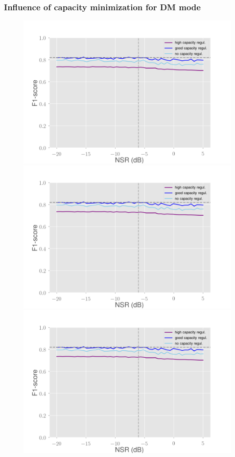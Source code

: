 \documentclass[10pt]{beamer}
\begin{document}
\begin{frame}
\frametitle{Influence of capacity minimization for DM mode}
\begin{multicols}{2}
\begin{figure}
\centering
\begin{overprint}
    \includegraphics[scale=0.2]{figs/capacity-dm-noisy}
    \includegraphics[scale=0.2]{figs/capacity-dm-noisy}
    \includegraphics[scale=0.2]{figs/capacity-dm-noisy}

\end{overprint}
\end{figure}
\end{multicols}
\end{frame}
\end{document}
